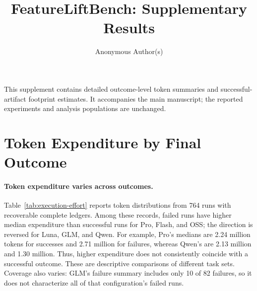 \documentclass[acmsmall,screen,review,anonymous,nonacm]{acmart}
\begin{document}
\title{FeatureLiftBench: Supplementary Results}
\author{Anonymous Author(s)}
\maketitle
This supplement contains detailed outcome-level token summaries and
successful-artifact footprint estimates. It accompanies the main manuscript;
the reported experiments and analysis populations are unchanged.

\section{Token Expenditure by Final Outcome}
\paragraph{Token expenditure varies across outcomes.}
Table~\ref{tab:execution-effort} reports token distributions from 764 runs
with recoverable complete ledgers. Among these records, failed runs have higher
median expenditure than successful runs for Pro, Flash, and OSS; the direction
is reversed for Luna, GLM, and Qwen. For example, Pro's medians are 2.24 million
tokens for successes and 2.71 million for failures, whereas Qwen's are 2.13
million and 1.30 million. Thus, higher expenditure does not consistently
coincide with a successful outcome. These are descriptive comparisons of
different task sets. Coverage also varies: GLM's failure summary includes only
10 of 82 failures, so it does not characterize all of that configuration's
failed runs.
\end{document}
